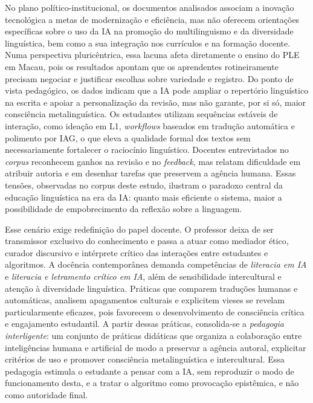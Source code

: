 \documentclass[portuguese]{textolivre}
\begin{document}
No plano político-institucional, os documentos analisados associam a inovação tecnológica a metas de modernização e eficiência, mas não oferecem orientações específicas sobre o uso da IA na promoção do multilinguismo e da diversidade linguística, bem como a sua integração nos currículos e na formação docente. Numa perspectiva pluricêntrica, essa lacuna afeta diretamente o ensino do PLE em Macau, pois os resultados apontam que os aprendentes rotineiramente precisam negociar e justificar escolhas sobre variedade e registro. Do ponto de vista pedagógico, os dados indicam que a IA pode ampliar o repertório linguístico na escrita e apoiar a personalização da revisão, mas não garante, por si só, maior consciência metalinguística. Os estudantes utilizam sequências estáveis de interação, como ideação em L1, \textit{workflows} baseados em tradução automática e polimento por IAG, o que eleva a qualidade formal dos textos sem necessariamente fortalecer o raciocínio linguístico. Docentes entrevistados no \textit{corpus} reconhecem ganhos na revisão e no \textit{feedback}, mas relatam dificuldade em atribuir autoria e em desenhar tarefas que preservem a agência humana. Essas tensões, observadas no corpus deste estudo, ilustram o paradoxo central da educação linguística na era da IA: quanto mais eficiente o sistema, maior a possibilidade de empobrecimento da reflexão sobre a linguagem.

Esse cenário exige redefinição do papel docente. O professor deixa de ser transmissor exclusivo do conhecimento e passa a atuar como mediador ético, curador discursivo e intérprete crítico das interações entre estudantes e algoritmos. A docência contemporânea demanda competências de \textit{literacia em IA} e \textit{literacia e letramento crítico em IA}, além de sensibilidade intercultural e atenção à diversidade linguística. Práticas que comparem traduções humanas e automáticas, analisem apagamentos culturais e explicitem vieses se revelam particularmente eficazes, pois favorecem o desenvolvimento de consciência crítica e engajamento estudantil. A partir dessas práticas, consolida-se a \textit{pedagogia interligente}: um conjunto de práticas didáticas que organiza a colaboração entre inteligências humana e artificial de modo a preservar a agência autoral, explicitar critérios de uso e promover consciência metalinguística e intercultural. Essa pedagogia estimula o estudante a pensar com a IA, sem reproduzir o modo de funcionamento desta, e a tratar o algoritmo como provocação epistêmica, e não como autoridade final.
\end{document}
